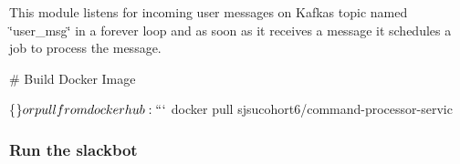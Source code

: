 This module listens for incoming user messages on Kafka\textquotesingle{}s topic named \char`\"{}user\+\_\+msg\char`\"{} in a forever loop and as soon as it receives a message it schedules a job to process the message.

\# Build Docker Image 
\begin{DoxyCode}
\{$\}

or pull from dockerhub:

```$ docker pull sjsucohort6/command-processor-servic
\end{DoxyCode}


\subsubsection*{Run the slackbot}


 